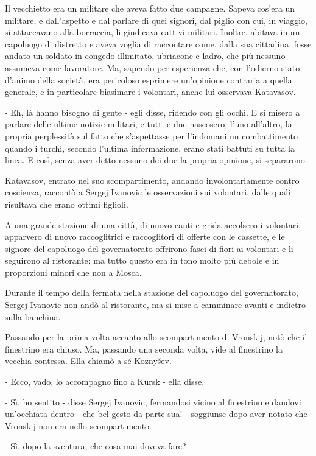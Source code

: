 Il vecchietto era un militare che aveva fatto due campagne. Sapeva cos'era un militare, e dall'aspetto e dal parlare di quei signori, dal piglio con cui, in viaggio, si attaccavano alla borraccia, li giudicava cattivi militari. Inoltre, abitava in un capoluogo di distretto e aveva voglia di raccontare come, dalla sua cittadina, fosse andato un soldato in congedo illimitato, ubriacone e ladro, che più nessuno assumeva come lavoratore. Ma, sapendo per esperienza che, con l'odierno stato d'animo della società, era pericoloso esprimere un'opinione contraria a quella generale, e in particolare biasimare i volontari, anche lui osservava Katavasov. 

- Eh, là hanno bisogno di gente - egli disse, ridendo con gli occhi. E si misero a parlare delle ultime notizie militari, e tutti e due nascosero, l'uno all'altro, la propria perplessità sul fatto che s'aspettasse per l'indomani un combattimento quando i turchi, secondo l'ultima informazione, erano stati battuti su tutta la linea. E così, senza aver detto nessuno dei due la propria opinione, si separarono. 

Katavasov, entrato nel suo scompartimento, andando involontariamente contro coscienza, raccontò a Sergej Ivanovic le osservazioni sui volontari, dalle quali risultava che erano ottimi figlioli. 

A una grande stazione di una città, di nuovo canti e grida accolsero i volontari, apparvero di nuovo raccoglitrici e raccoglitori di offerte con le cassette, e le signore del capoluogo del governatorato offrirono fasci di fiori ai volontari e li seguirono al ristorante; ma tutto questo era in tono molto più debole e in proporzioni minori che non a Mosca. 

Durante il tempo della fermata nella stazione del capoluogo del governatorato, Sergej Ivanovic non andò al ristorante, ma si mise a camminare avanti e indietro sulla banchina. 

Passando per la prima volta accanto allo scompartimento di Vronskij, notò che il finestrino era chiuso. Ma, passando una seconda volta, vide al finestrino la vecchia contessa. Ella chiamò a sé Koznyšev. 

- Ecco, vado, lo accompagno fino a Kursk - ella disse. 

- Sì, ho sentito - disse Sergej Ivanovic, fermandosi vicino al finestrino e dandovi un'occhiata dentro - che bel gesto da parte sua! - soggiunse dopo aver notato che Vronskij non era nello scompartimento. 

- Sì, dopo la sventura, che cosa mai doveva fare? 

